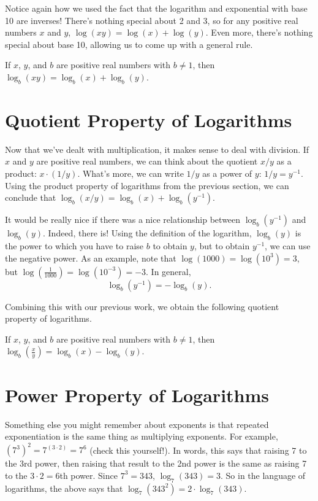 \documentclass[nooutcomes]{ximera}
\begin{document}
Notice again how we used the fact that the logarithm and exponential with base 10 are inverses! There's nothing special about 2 and 3, so for any positive real numbers $x$ and $y$, $\log(xy) = \log(x) + \log(y)$. Even more, there's nothing special about base 10, allowing us to come up with a general rule.
\begin{callout}
If $x$, $y$, and $b$ are positive real numbers with $b \ne 1$, then $\log_b(xy) = \log_b(x) + \log_b(y)$.
\end{callout} 

\section{Quotient Property of Logarithms}
Now that we've dealt with multiplication, it makes sense to deal with division. If $x$ and $y$ are positive real numbers, we can think about the quotient $x/y$ as a product: $x \cdot (1/y)$. What's more, we can write $1/y$ as a power of $y$: $1/y = y^{-1}$. Using the product property of logarithms from the previous section, we can conclude that $\log_b(x/y) = \log_b(x) + \log_b(y^{-1})$. 

It would be really nice if there was a nice relationship between $\log_b(y^{-1})$ and $\log_b(y)$. Indeed, there is! Using the definition of the logarithm, $\log_b(y)$ is the power to which you have to raise $b$ to obtain $y$, but to obtain $y^{-1}$, we can use the negative power. As an example, note that $\log(1000) = \log(10^3) = 3$, but $\log\left(\frac{1}{1000}\right) = \log(10^{-3}) = -3$. In general, 
$$
\log_b(y^{-1}) = -\log_b(y).
$$

Combining this with our previous work, we obtain the following quotient property of logarithms.
\begin{callout}
If $x$, $y$, and $b$ are positive real numbers with $b \ne 1$, then $\log_b\left(\frac{x}{y}\right) = \log_b(x) - \log_b(y)$.
\end{callout} 

\section{Power Property of Logarithms}
Something else you might remember about exponents is that repeated exponentiation is the same thing as multiplying exponents. For example, $(7^3)^2 = 7^{(3\cdot 2)} = 7^6$ (check this yourself!). In words, this says that raising 7 to the 3rd power, then raising that result to the 2nd power is the same as raising 7 to the $3 \cdot 2 = 6$th power. Since $7^3 = 343$, $\log_7(343) = 3$. So in the language of logarithms, the above says that $\log_7(343^2) = 2\cdot \log_7(343)$. 
\end{document}
